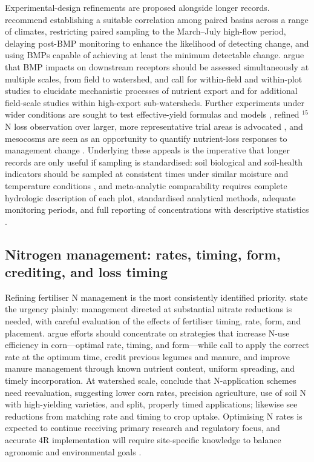 Experimental-design refinements are proposed alongside longer records. \textcite{Schilling2013} recommend establishing a suitable correlation among paired basins across a range of climates, restricting paired sampling to the March--July high-flow period, delaying post-BMP monitoring to enhance the likelihood of detecting change, and using BMPs capable of achieving at least the minimum detectable change. \textcite{Sunohara2016} argue that BMP impacts on downstream receptors should be assessed simultaneously at multiple scales, from field to watershed, and \textcite{Irvine2019} call for within-field and within-plot studies to elucidate mechanistic processes of nutrient export and for additional field-scale studies within high-export sub-watersheds. Further experiments under wider conditions are sought to test effective-yield formulas and models \parencite{Xin2016c}, refined $^{15}$N loss observation over larger, more representative trial areas is advocated \parencite{Xiong2025}, and mesocosms are seen as an opportunity to quantify nutrient-loss responses to management change \parencite{Loper2024}. Underlying these appeals is the imperative that longer records are only useful if sampling is standardised: soil biological and soil-health indicators should be sampled at consistent times under similar moisture and temperature conditions \parencite{Sherbine2023,Li2023b}, and meta-analytic comparability requires complete hydrologic description of each plot, standardised analytical methods, adequate monitoring periods, and full reporting of concentrations with descriptive statistics \parencite{Ghirardini2019}.

\subsection{Nitrogen management: rates, timing, form, crediting, and loss timing}

Refining fertiliser N management is the most consistently identified priority. \textcite{ROSSI1991} state the urgency plainly: management directed at substantial nitrate reductions is needed, with careful evaluation of the effects of fertiliser timing, rate, form, and placement. \textcite{Zhao2000} argue efforts should concentrate on strategies that increase N-use efficiency in corn---optimal rate, timing, and form---while \textcite{Randall2001} call to apply the correct rate at the optimum time, credit previous legumes and manure, and improve manure management through known nutrient content, uniform spreading, and timely incorporation. At watershed scale, \textcite{Dattamudi2020} conclude that N-application schemes need reevaluation, suggesting lower corn rates, precision agriculture, use of soil N with high-yielding varieties, and split, properly timed applications; \textcite{Elmi2002} likewise see reductions from matching rate and timing to crop uptake. Optimising N rates is expected to continue receiving primary research and regulatory focus, and accurate 4R implementation will require site-specific knowledge to balance agronomic and environmental goals \parencite{Christianson2015b}.

